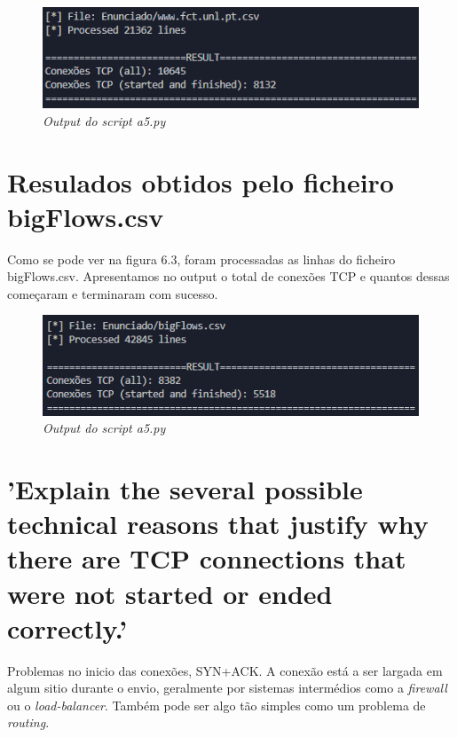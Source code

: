 \begin{figure}[h]
    \label{high}
    \centering
    \includegraphics[width=1\textwidth]{Images/a5/a5_a.png}
    \caption{\textit{Output do script a5.py}}
\end{figure}


\section{Resulados obtidos pelo ficheiro bigFlows.csv}

Como se pode ver na figura 6.3, foram processadas as linhas do ficheiro bigFlows.csv. Apresentamos no output o total de conexões TCP e quantos dessas começaram e terminaram com sucesso.

\begin{figure}[h!]
    \label{high}
    \centering
    \includegraphics[width=1\textwidth]{Images/a5/a5_b.png}
    \caption{\textit{Output do script a5.py}}
\end{figure}


\clearpage

\section{'Explain the several possible technical reasons that justify why there are TCP connections that were not started or ended correctly.'}

Problemas no inicio das conexões, SYN+ACK.
A conexão está a ser largada em algum sitio durante o envio, geralmente por sistemas intermédios como a \textit{firewall} ou o \textit{load-balancer}. 
Também pode ser algo tão simples como um problema de \textit{routing}.

